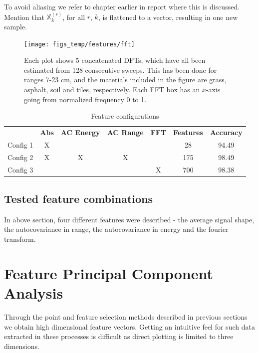To avoid aliasing we refer to chapter earlier in report where this is discussed. Mention that $\mathbb{X}_k^{(r)}$, for all $r$, $k$, is flattened to a vector, resulting in one new sample.

\begin{figure}[h]
	\centering
	\texttt{[image: figs\_temp/features/fft]}
	\caption{Each plot shows 5 concatenated DFTs, which have all been estimated from 128 consecutive sweeps. This has been done for ranges 7-23 cm, and the materials included in the figure are grass, asphalt, soil and tiles, respectively. Each FFT box has an $x$-axis going from normalized frequency 0 to 1.}
	\label{fig:fft}
\end{figure}

\begin{table}
\begin{center}
  \begin{tabular}{|c|cccccc|}
\hline
    \rowcolor{gray!150}
		  & \color{white}\textbf{Abs} & \color{white}\textbf{AC Energy} & \color{white}\textbf{AC Range} & \color{white}\textbf{FFT} & \color{white}\textbf{Features} & \color{white}\textbf{Accuracy} \\
	  Config 1 & X &   &   &   & 28  & 94.49 \\
	  Config 2 & X & X & X & & 175 & 98.49 \\
	  Config 3 & & & & X & 700 & 98.38 \\
\hline
  \end{tabular}
\end{center}
\caption{Feature configurations}
\end{table}


\subsection{Tested feature combinations}

In above section, four different features were described - the average signal shape, the autocovariance in range, the autocovariance in energy and the fourier transform.


\section{Feature Principal Component Analysis}

Through the point and feature selection methods described in previous sections we obtain high dimensional feature vectors. Getting an intuitive feel for such data extracted in these processes is difficult as direct plotting is limited to three dimensions. 

